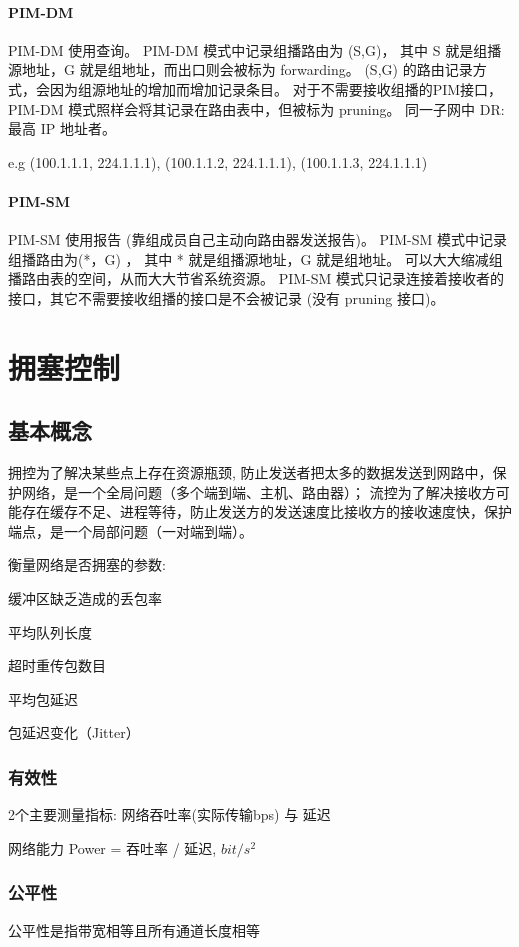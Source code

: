 \documentclass[UTF8,cs4size]{ctexart}
\begin{document}
\paragraph{PIM-DM}
PIM-DM 使用查询。
PIM-DM 模式中记录组播路由为 (S,G)，
其中 S 就是组播源地址，G 就是组地址，而出口则会被标为 forwarding。
(S,G) 的路由记录方式，会因为组源地址的增加而增加记录条目。
对于不需要接收组播的PIM接口，PIM-DM 模式照样会将其记录在路由表中，但被标为 pruning。
同一子网中 DR: 最高 IP 地址者。

e.g (100.1.1.1, 224.1.1.1), (100.1.1.2, 224.1.1.1), (100.1.1.3, 224.1.1.1)
\paragraph{PIM-SM}
PIM-SM 使用报告 (靠组成员自己主动向路由器发送报告)。
PIM-SM 模式中记录组播路由为(*，G) ，
其中 * 就是组播源地址，G 就是组地址。
可以大大缩减组播路由表的空间，从而大大节省系统资源。
PIM-SM 模式只记录连接着接收者的接口，其它不需要接收组播的接口是不会被记录 (没有 pruning 接口)。
\clearpage

\section{拥塞控制}
\subsection{基本概念}
拥控为了解决某些点上存在资源瓶颈, 防止发送者把太多的数据发送到网路中，保护网络，是一个全局问题（多个端到端、主机、路由器）；
流控为了解决接收方可能存在缓存不足、进程等待，防止发送方的发送速度比接收方的接收速度快，保护端点，是一个局部问题（一对端到端）。

衡量网络是否拥塞的参数:
\begin{compactitem}
  \item 缓冲区缺乏造成的丢包率
  \item 平均队列长度
  \item 超时重传包数目
  \item 平均包延迟
  \item 包延迟变化（Jitter）
\end{compactitem}
\subsubsection{有效性}
2个主要测量指标: 网络吞吐率(实际传输bps) 与 延迟

网络能力 Power = 吞吐率 / 延迟, $bit/s^2$
\subsubsection{公平性}
公平性是指带宽相等且所有通道长度相等
\end{document}
